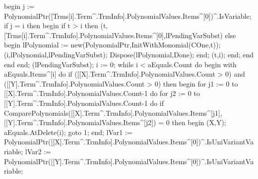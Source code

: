                   begin
                     j := PolynomialPtr([Trms[i].Term^.TrmInfo].PolynomialValues.Items^[0])^.IsVariable;
                     if j = i then
                     begin
                        if t > i then
                           (t,[Trms[i].Term^.TrmInfo].PolynomialValues.Items^[0],lPendingVarSubst)
                        else
                        begin
                           lPolynomial := new(PolynomialPtr,InitWithMonomial(COne,t));
                           (i,lPolynomial,lPendingVarSubst);
                           Dispose(lPolynomial,Done);
                        end;
                        (t,i);
                     end;
                  end
               end
            end;
      (lPendingVarSubst);
      i := 0;
      while i < aEquals.Count do
      begin
         with aEquals.Items^[i] do
            if ([[X].Term^.TrmInfo].PolynomialValues.Count > 0) and
                  ([[Y].Term^.TrmInfo].PolynomialValues.Count > 0) then
            begin
               for j1 := 0 to [[X].Term^.TrmInfo].PolynomialValues.Count-1 do
                  for j2 := 0 to [[Y].Term^.TrmInfo].PolynomialValues.Count-1 do
                     if ComparePolynomials([[X].Term^.TrmInfo].PolynomialValues.Items^[j1],
                                           [[Y].Term^.TrmInfo].PolynomialValues.Items^[j2]) = 0 then
                     begin
                        (X,Y);
                        aEquals.AtDelete(i);
                        goto 1;
                     end;
               lVar1 := PolynomialPtr([[X].Term^.TrmInfo].PolynomialValues.Items^[0])^.IsUniVariantVariable;
               lVar2 := PolynomialPtr([[Y].Term^.TrmInfo].PolynomialValues.Items^[0])^.IsUniVariantVariable;

